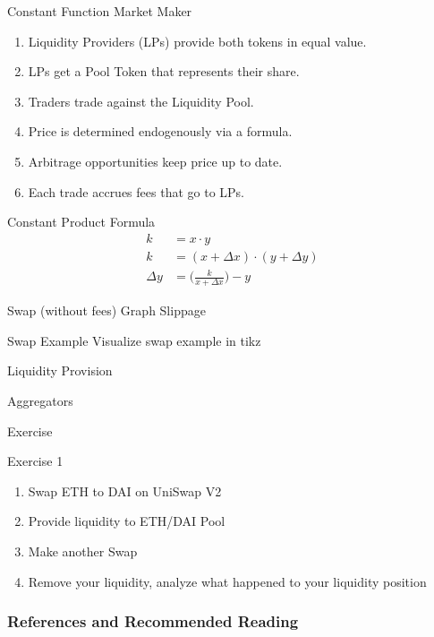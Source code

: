 \documentclass[]{beamer}
\begin{document}
\begin{frame}{Constant Function Market Maker}
\begin{figure}
\begin{tikzpicture}
		
	\end{tikzpicture}
\end{figure}


\begin{enumerate}
	\item<2-> Liquidity Providers (LPs) provide both tokens in equal value.
	\item<3-> LPs get a Pool Token that represents their share.
	\item<4-> Traders trade against the Liquidity Pool.
	\item<5-> Price is determined endogenously via a formula.
	\item<6-> Arbitrage opportunities keep price up to date.
	\item<6-> Each trade accrues fees that go to LPs.
\end{enumerate}
\end{frame}


\begin{frame}{Constant Product Formula}
\begin{align*}
		k &= x \cdot y \\
		k &= (x + \Delta x) \cdot (y + \Delta y) \\
		\Delta y &= \biggl( \frac{k}{x + \Delta x} \biggr) - y 
	\end{align*} 
\end{frame}

\begin{frame}{Swap (without fees)}
Graph
Slippage
\end{frame}

\begin{frame}{Swap Example}
Visualize swap example in tikz
\end{frame}

\begin{frame}{Liquidity Provision}
\end{frame}


\begin{frame}{Aggregators}

\end{frame}


\begin{frame}{Exercise}
	\begin{exercise}{Exercise 1}
		\begin{enumerate}
			\item Swap ETH to DAI on UniSwap V2
			\item Provide liquidity to ETH/DAI Pool
			\item Make another Swap
			\item Remove your liquidity, analyze what happened to your liquidity position
		\end{enumerate}
	\end{exercise}
\end{frame}



\begin{frame}%
\frametitle{References and Recommended Reading}
	
	
\end{frame}
\end{document}
